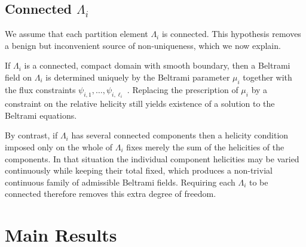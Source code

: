 \documentclass[11pt]{article}
\theoremstyle{plain}
\theoremstyle{definition}
\theoremstyle{remark}
\newcommand{\ST}{\Lambda}
\begin{document}
\subsection{Connected \texorpdfstring{\(\ST_i\)}{Domains}}

We assume that each partition element \(\ST_i\) is connected. This hypothesis removes a benign but inconvenient source of non-uniqueness, which we now explain.

If \(\ST_i\) is a connected, compact domain with smooth boundary, then a Beltrami field on \(\ST_i\) is determined uniquely by the Beltrami parameter \(\mu_i\) together with the flux constraints \(\psi_{i,1},\dots,\psi_{i,\ell_i}\) \cite{yoshida2012helical}. Replacing the prescription of \(\mu_i\) by a constraint on the relative helicity still yields existence of a solution to the Beltrami equations.

By contrast, if \(\ST_i\) has several connected components then a helicity condition imposed only on the whole of \(\ST_i\) fixes merely the sum of the helicities of the components. In that situation the individual component helicities may be varied continuously while keeping their total fixed, which produces a non-trivial continuous family of admissible Beltrami fields. Requiring each \(\ST_i\) to be connected therefore removes this extra degree of freedom.





\section{Main Results}\label{section:Main Results}
\end{document}
